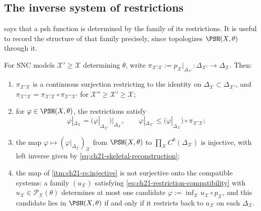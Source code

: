 \subsection{The inverse system of restrictions}
\label{sec:ch21-inverse-system}

 says that a psh function is
determined by the family of its restrictions.  It is useful to record the
structure of that family precisely, since 
topologizes $\PSH(X,\theta)$ through it.

\begin{proposition}
\label{prop:ch21-restriction-system}
For SNC models $\mathcal X'\geq\mathcal X$ determining $\theta$, write
$\pi_{\mathcal X'\mathcal X}:=p_{\mathcal X}|_{\Delta_{\mathcal X'}}:
\Delta_{\mathcal X'}\to\Delta_{\mathcal X}$.  Then:
\begin{enumerate}
\item\label{itm:ch21-rs:transition}
$\pi_{\mathcal X'\mathcal X}$ is a continuous surjection restricting to
the identity on $\Delta_{\mathcal X}\subset\Delta_{\mathcal X'}$, and
$\pi_{\mathcal X''\mathcal X}=\pi_{\mathcal X'\mathcal X}\circ
\pi_{\mathcal X''\mathcal X'}$ for
$\mathcal X''\geq\mathcal X'\geq\mathcal X$;
\item\label{itm:ch21-rs:compat}
for $\varphi\in\PSH(X,\theta)$, the restrictions satisfy
\begin{equation}
\label{eq:ch21-restriction-compatibility}
 \varphi|_{\Delta_{\mathcal X}}
 =\bigl(\varphi|_{\Delta_{\mathcal X'}}\bigr)\big|_{\Delta_{\mathcal X}},
 \qquad
 \varphi|_{\Delta_{\mathcal X'}}
 \leq\bigl(\varphi|_{\Delta_{\mathcal X}}\bigr)\circ
     \pi_{\mathcal X'\mathcal X};
\end{equation}
\item\label{itm:ch21-rs:injective}
the map
$\varphi\mapsto(\varphi|_{\Delta_{\mathcal X}})_{\mathcal X}$ from
$\PSH(X,\theta)$ to $\prod_{\mathcal X}C^0(\Delta_{\mathcal X})$ is
injective, with left inverse given by
\eqref{eq:ch21-skeletal-reconstruction};
\item\label{itm:ch21-rs:notsurjective}
the map of \cref{itm:ch21-rs:injective} is not surjective onto the compatible
systems: a family $(u_{\mathcal X})$ satisfying
\eqref{eq:ch21-restriction-compatibility} with
$u_{\mathcal X}\in\mathcal P_{\mathcal X}(\theta)$ determines at most one
candidate $\varphi:=\inf_{\mathcal X}u_{\mathcal X}\circ p_{\mathcal X}$,
and this candidate lies in $\PSH(X,\theta)$ if and only if it restricts
back to $u_{\mathcal X}$ on each $\Delta_{\mathcal X}$.
\end{enumerate}
\end{proposition}

